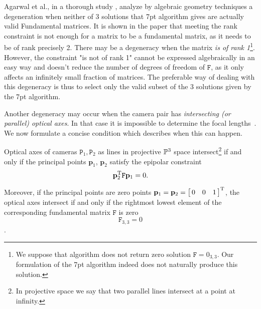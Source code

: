Agarwal et al., in a thorough study \cite{OnExistence}, analyze by algebraic geometry techniques a degeneration when neither of 3 solutions that 7pt algorithm gives are actually valid Fundamental matrices. It is shown in the paper that meeting the rank constraint is not enough for a matrix to be a fundamental matrix, as it needs to be of rank precisely 2. There may be a degeneracy when the matrix \textit{is of rank 1}\footnote{We suppose that algorithm does not return zero solution $\mathtt{F}=0_{3,3}$. Our formulation of the 7pt algorithm indeed does not naturally produce this solution.}. However, the constraint "is not of rank 1" cannot be expressed algebraically in an easy way and doesn't reduce the number of degrees of freedom of $\mathtt{F}$, as it only affects an infinitely small fraction of matrices. The preferable way of dealing with this degeneracy is thus to select only the valid subset of the 3 solutions given by the 7pt algorithm.

Another degeneracy may occur when the camera pair has \textit{intersecting (or parallel) optical axes}. In that case it is impossible to determine the focal lengths~\cite{KanataniClosed}. We now formulate a concise condition which describes when this can happen.

\begin{lem}
Optical axes of cameras $\mathtt{P}_1, \mathtt{P}_2$ as lines in projective $\Proj^3$ space intersect\footnote{In projective space we say that two parallel lines intersect at a point at infinity.} if and only if the principal points $\mathbf{p}_1$, $\mathbf{p}_2$ satisfy the epipolar constraint \begin{equation*}
      \mathbf{p}_2^\T \mathtt{F} \mathbf{p}_1 = 0.
\end{equation*} 

Moreover, if the principal points are zero points $\mathbf{p}_1=\mathbf{p}_2=\mat{ccc}{0 & 0 & 1}^\T$, the optical axes intersect if and only if the rightmost lowest element of the corresponding fundamental matrix $\mathtt{F}$ is zero \[ \mathtt{F}_{3,3} = 0\].
\label{interlemma}
\end{lem}

